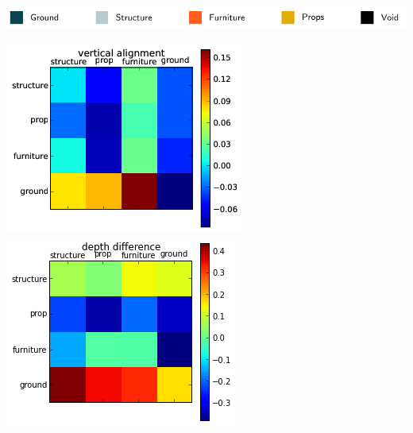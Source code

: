 \documentclass[final,ignorenonframetext,compress]{beamer}
\begin{document}
\begin{frame}
\begin{tabularx}{\linewidth}{@{\extracolsep{\fill}}cccccc}

    \end{tabularx}
        \includegraphics[width=\linewidth]{legend.pdf}
    \end{frame}


    \begin{frame}
    \begin{center}
    \includegraphics[width=.45\linewidth]{images/vertical_alignment_png}
    \includegraphics[width=.45\linewidth]{images/depth_difference_png}
    \end{center}
    \end{frame}
\end{document}
